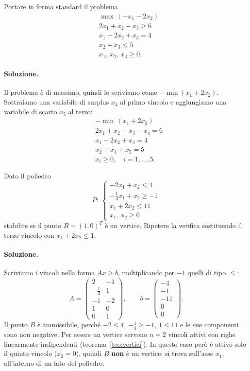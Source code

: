 \begin{esercizio}
Portare in forma standard il problema
\[
\begin{aligned}
&\max\, (-x_1 - 2x_2) \\
&2x_1 + x_2 - x_3 \ge 6 \\
&x_1 - 2x_2 + x_3 = 4 \\
&x_2 + x_3 \le 5 \\
&x_1,\, x_2,\, x_3 \ge 0.
\end{aligned}
\]
\end{esercizio}

\paragraph{Soluzione.}
Il problema è di massimo, quindi lo scriviamo come $-\min(x_1 + 2x_2)$. Sottraiamo una variabile di surplus $x_4$ al primo vincolo e aggiungiamo una variabile di scarto $x_5$ al terzo:
\[
\begin{aligned}
&-\min\, (x_1 + 2x_2) \\
&2x_1 + x_2 - x_3 - x_4 = 6 \\
&x_1 - 2x_2 + x_3 = 4 \\
&x_2 + x_3 + x_5 = 5 \\
&x_i \ge 0, \quad i = 1, \dots, 5.
\end{aligned}
\]

\begin{esercizio}
Dato il poliedro
\[
P:\ \begin{cases}
-2x_1 + x_2 \le 4 \\
-\frac14 x_1 + x_2 \ge -1 \\
x_1 + 2x_2 \le 11 \\
x_1,\, x_2 \ge 0
\end{cases}
\]
stabilire se il punto $B = (1, 0)^T$ è un vertice. Ripetere la verifica sostituendo il terzo vincolo con $x_1 + 2x_2 \le 1$.
\end{esercizio}

\paragraph{Soluzione.}
Scriviamo i vincoli nella forma $A x \ge b$, moltiplicando per $-1$ quelli di tipo $\le$:
\[
A = \begin{pmatrix} 2 & -1 \\ -\frac14 & 1 \\ -1 & -2 \\ 1 & 0 \\ 0 & 1 \end{pmatrix}, \qquad
b = \begin{pmatrix} -4 \\ -1 \\ -11 \\ 0 \\ 0 \end{pmatrix}.
\]
Il punto $B$ è ammissibile, perché $-2 \le 4$, $-\frac14 \ge -1$, $1 \le 11$ e le sue componenti sono non negative. Per essere un vertice servono $n = 2$ vincoli attivi con righe linearmente indipendenti (teorema~\ref{teo:vertici}). In questo caso però è attivo solo il quinto vincolo ($x_2 = 0$), quindi $B$ \textbf{non} è un vertice: si trova sull'asse $x_1$, all'interno di un lato del poliedro.

